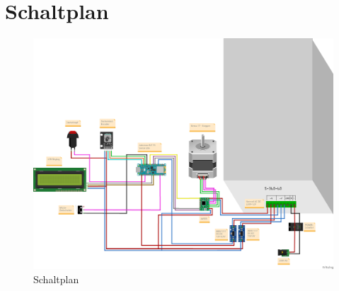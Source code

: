 \section{Schaltplan}
\begin{figure}[htb]
	\begin{center}
		\includegraphics[width=\textwidth]{Images/Schaltplan1.png}
		\caption{Schaltplan} \label{Schaltplan}
	\end{center}
\end{figure}





